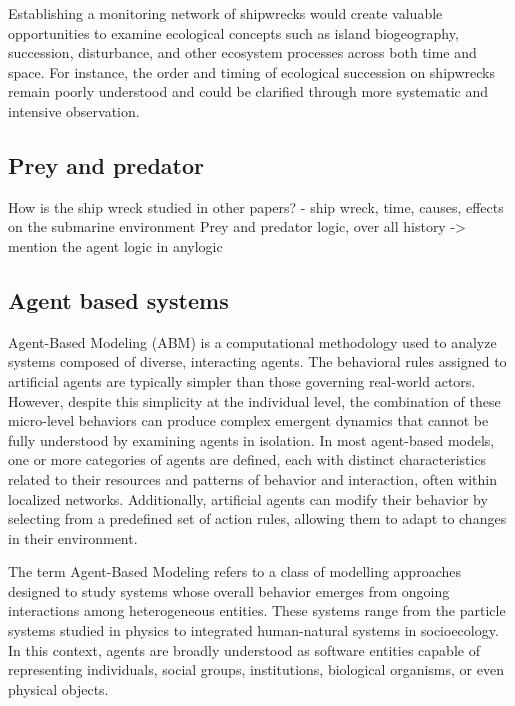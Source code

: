 \documentclass[10pt,a4paper,twocolumn]{article}
\begin{document}
Establishing a monitoring network of shipwrecks would create valuable opportunities to examine ecological concepts such as island biogeography, succession, disturbance, and other ecosystem processes across both time and space. For instance, the order and timing of ecological succession on shipwrecks remain poorly understood and could be clarified through more systematic and intensive observation.\cite{ShipsPaxton}


\subsection{Prey and predator}
 
How is the ship wreck studied in other papers?
- ship wreck, time, causes, effects on the submarine environment
Prey and predator logic, over all history
-> mention the agent logic in anylogic
\subsection{Agent based systems}

Agent-Based Modeling (ABM) is a computational methodology used to analyze systems composed of diverse, interacting agents. The behavioral rules assigned to artificial agents are typically simpler than those governing real-world actors. 
However, despite this simplicity at the individual level, the combination of these micro-level behaviors can produce complex emergent dynamics that cannot be fully understood by examining agents in isolation.\cite{ar:GallegatiEtAl2024}
In most agent-based models, one or more categories of agents are defined, each with distinct characteristics related to their resources and patterns of behavior and interaction, often within localized networks. Additionally, artificial agents can modify their behavior by selecting from a predefined set of action rules, allowing them to adapt to changes in their environment.\cite{ar:GallegatiEtAl2024}

 The term Agent-Based Modeling refers to a class of modelling approaches designed to study systems whose overall behavior emerges from ongoing interactions among heterogeneous entities. These systems range from the particle systems studied in physics to integrated human-natural systems in socioecology. In this context, agents are broadly understood as software entities capable of representing individuals, social groups, institutions, biological organisms, or even physical objects.\cite{ar:GallegatiEtAl2024}
\end{document}

